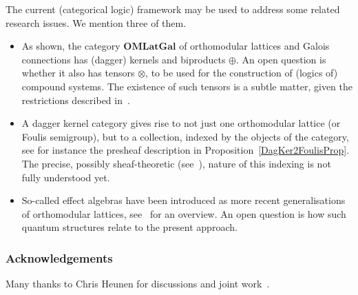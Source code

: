 \documentclass{article}
\newcommand{\Cat}[1]{\ensuremath{\mathbf{#1}}}
\begin{document}
The current (categorical logic) framework may be used to address some
related research issues. We mention three of them.
\begin{itemize}
\item As shown, the category \Cat{OMLatGal} of orthomodular lattices
  and Galois connections has (dagger) kernels and biproducts
  $\oplus$. An open question is whether it also has tensors $\otimes$,
  to be used for the construction of (logics of) compound systems. The
  existence of such tensors is a subtle matter, given the restrictions
  described in~\cite{RandallF79}.

\item A dagger kernel category gives rise to not just one orthomodular
  lattice (or Foulis semigroup), but to a collection, indexed by the
  objects of the category, see for instance the presheaf description
  in Proposition~\ref{DagKer2FoulisProp}. The precise, possibly
  sheaf-theoretic (see~\cite{GravesS73}), nature of this indexing is
  not fully understood yet.

\item So-called effect algebras have been introduced as more recent
  generalisations of orthomodular lattices, see~\cite{DvurecenskijP00}
  for an overview. An open question is how such quantum structures
  relate to the present approach.
\end{itemize}


\subsubsection*{Acknowledgements}

Many thanks to Chris Heunen for discussions and joint
work~\cite{HeunenJ09a}.
\end{document}
